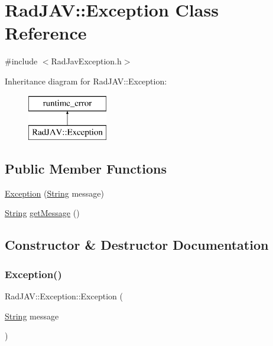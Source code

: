 \hypertarget{class_rad_j_a_v_1_1_exception}{}\section{Rad\+J\+AV\+:\+:Exception Class Reference}
\label{class_rad_j_a_v_1_1_exception}


{\ttfamily \#include $<$Rad\+Jav\+Exception.\+h$>$}

Inheritance diagram for Rad\+J\+AV\+:\+:Exception\+:\begin{figure}[H]
\begin{center}
\leavevmode
\includegraphics[height=2.000000cm]{class_rad_j_a_v_1_1_exception}
\end{center}
\end{figure}
\subsection*{Public Member Functions}
\begin{DoxyCompactItemize}
\item 
\mbox{\hyperlink{class_rad_j_a_v_1_1_exception_ac29a4a87089f239315155858aa2f9bad}{Exception}} (\mbox{\hyperlink{class_rad_j_a_v_1_1_string}{String}} message)
\item 
\mbox{\hyperlink{class_rad_j_a_v_1_1_string}{String}} \mbox{\hyperlink{class_rad_j_a_v_1_1_exception_ad996ff7a0fcb2b357beff4742cc759ea}{get\+Message}} ()
\end{DoxyCompactItemize}


\subsection{Constructor \& Destructor Documentation}
\mbox{\label{class_rad_j_a_v_1_1_exception_ac29a4a87089f239315155858aa2f9bad}} 
\subsubsection{\texorpdfstring{Exception()}{Exception()}}
{\footnotesize\ttfamily Rad\+J\+A\+V\+::\+Exception\+::\+Exception (\begin{DoxyParamCaption}\item[{\mbox{\hyperlink{class_rad_j_a_v_1_1_string}{String}}}]{message }\end{DoxyParamCaption})\hspace{0.3cm}{\ttfamily [inline]}}




